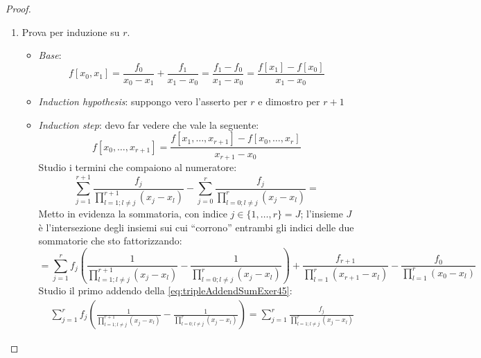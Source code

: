 \begin{proof}
\begin{enumerate}
  \item Prova per induzione su $r$.
  \begin{itemize}
    \item \emph{Base}:
    \begin{displaymath}
    	f[x_{0}, x_{1}] = \frac{f_{0}}{x_{0} - x_{1}} + \frac{f_{1}}{x_{1} - x_{0}}
    	= \frac{f_{1} - f_{0}}{x_{1} - x_{0}} = \frac{f[x_{1}] - f[x_{0}]}{x_{1} -
    	x_{0}}
    \end{displaymath}
  
  \item \emph{Induction hypothesis}: suppongo vero l'asserto per $r$ e dimostro
  per $r+1$
  \item \emph{Induction step}: devo far vedere che vale la seguente:
  	\begin{equation}
  	\label{eq:inductionStepExer45}
    	f[x_{0},\ldots, x_{r+1}] = 
    	\frac{ f[x_{1},\ldots, x_{r+1}] - f[x_{0},\ldots, x_{r}]}{x_{r+1} - x_{0}}
    \end{equation}
    Studio i termini che compaiono al numeratore:
    \begin{displaymath}
    	\sum_{j = 1}^{r+1}{
  		\frac{f_{j}}{\prod_{l = 1;l \not = j}^{r+1}{(x_{j} - x_{l})}}} - 
  		\sum_{j = 0}^{r}{
  		\frac{f_{j}}{\prod_{l = 0;l \not = j}^{r}{(x_{j} - x_{l})}}} = 
  	\end{displaymath}
  	Metto in evidenza la sommatoria, con indice $j \in \{1,\ldots,r\} = J$;
  	l'insieme $J$ \`e l'intersezione degli insiemi sui cui ``corrono''
  	entrambi gli indici delle due sommatorie che sto fattorizzando:
  	\begin{equation}
  	\label{eq:tripleAddendSumExer45}
     	= \sum_{j = 1}^{r}{
  		f_{j} \left ( \frac{1}{\prod_{l = 1;l \not = j}^{r+1}{(x_{j} - x_{l})}} -
  		\frac{1}{\prod_{l = 0;l \not = j}^{r}{(x_{j} - x_{l})}}
  		\right)} + 
  		\frac{f_{r+1}}{\prod_{l = 1}^{r}{(x_{r+1} - x_{l})}} -
  		\frac{f_{0}}{\prod_{l = 1}^{r}{(x_{0} - x_{l})}}
  	\end{equation}
  	Studio il primo addendo della \ref{eq:tripleAddendSumExer45}:
  	\begin{displaymath}
  	\begin{split}
     	& \sum_{j = 1}^{r}{
  		f_{j} \left ( \frac{1}{\prod_{l = 1;l \not = j}^{r+1}{(x_{j} - x_{l})}} -
  		\frac{1}{\prod_{l = 0;l \not = j}^{r}{(x_{j} - x_{l})}}
  		\right)} = 
  		\sum_{j = 1}^{r}{
  		\frac{f_{j}}{\prod_{l = 1;l \not = j}^{r}{(x_{j} - x_{l})}} 
}
\end{split}
\end{displaymath}
\end{itemize}
\end{enumerate}
\end{proof}
